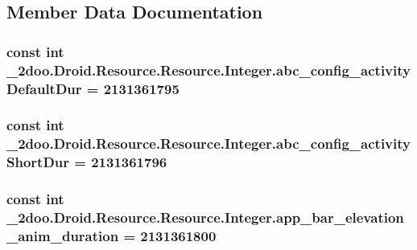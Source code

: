 \subsection{Member Data Documentation}
\hypertarget{class__2doo_1_1_droid_1_1_resource_1_1_integer_058b4b1e30bfc11be0626549cce96bee}{
\subsubsection[{abc\_\-config\_\-activityDefaultDur}]{\setlength{\rightskip}{0pt plus 5cm}const int \_\-2doo.Droid.Resource.Resource.Integer.abc\_\-config\_\-activityDefaultDur = 2131361795}}
\label{class__2doo_1_1_droid_1_1_resource_1_1_integer_058b4b1e30bfc11be0626549cce96bee}


\hypertarget{class__2doo_1_1_droid_1_1_resource_1_1_integer_482e0f2d8ca0e8b5a579e2beb8ee8782}{
\subsubsection[{abc\_\-config\_\-activityShortDur}]{\setlength{\rightskip}{0pt plus 5cm}const int \_\-2doo.Droid.Resource.Resource.Integer.abc\_\-config\_\-activityShortDur = 2131361796}}
\label{class__2doo_1_1_droid_1_1_resource_1_1_integer_482e0f2d8ca0e8b5a579e2beb8ee8782}


\hypertarget{class__2doo_1_1_droid_1_1_resource_1_1_integer_e4d7528bd04adaa7c39b17f892f35fa4}{
\subsubsection[{app\_\-bar\_\-elevation\_\-anim\_\-duration}]{\setlength{\rightskip}{0pt plus 5cm}const int \_\-2doo.Droid.Resource.Resource.Integer.app\_\-bar\_\-elevation\_\-anim\_\-duration = 2131361800}}
\label{class__2doo_1_1_droid_1_1_resource_1_1_integer_e4d7528bd04adaa7c39b17f892f35fa4}


